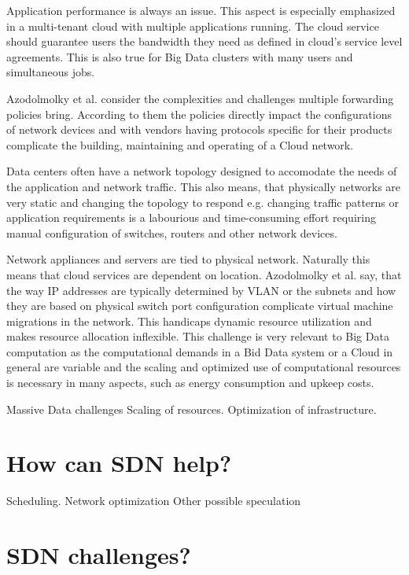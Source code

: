 \documentclass{acm_proc_article-sp}
\begin{document}
Application performance is always an issue. This aspect is especially emphasized in a multi-tenant cloud with multiple applications running. The cloud service should guarantee users the bandwidth they need as defined in cloud's service level agreements. This is also true for Big Data clusters with many users and simultaneous jobs.

Azodolmolky et al. consider the complexities and challenges multiple forwarding policies bring. According to them the policies directly impact the configurations of network devices and with vendors having protocols specific for their products complicate the building, maintaining and operating of a Cloud network.

Data centers often have a network topology designed to accomodate the needs of the application and network traffic. This also means, that physically networks are very static and changing the topology to respond e.g. changing traffic patterns or application requirements is a labourious and time-consuming effort requiring manual configuration of switches, routers and other network devices.

Network appliances and servers are tied to physical network. Naturally this means that cloud services are dependent on location. Azodolmolky et al. say, that the way IP addresses are typically determined by VLAN or the subnets and how they are based on physical switch port configuration complicate virtual machine migrations in the network. This handicaps dynamic resource utilization and makes resource allocation inflexible. This challenge is very relevant to Big Data computation as the computational demands in a Bid Data system or a Cloud in general are variable and the scaling and optimized use of computational resources is necessary \cite{Frontiers} in many aspects, such as energy consumption and upkeep costs.


Massive Data challenges \cite{Frontiers} \cite{Azodolmolky}
Scaling of resources.
Optimization of infrastructure.

\section{How can SDN help?}

Scheduling. \cite{Scheduling}
Network optimization \cite{Wang:2012:PYN:2342441.2342462}
Other possible speculation

\section{SDN challenges?}
\end{document}
